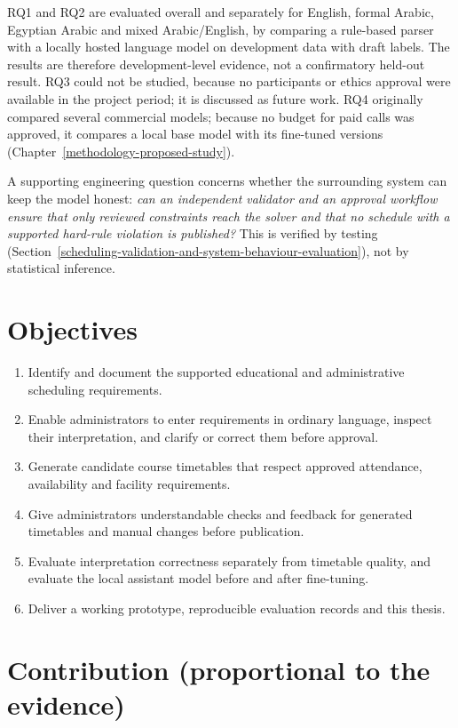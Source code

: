 RQ1 and RQ2 are evaluated overall and separately for English, formal Arabic, Egyptian Arabic and mixed Arabic/English, by comparing a rule-based parser with a locally hosted language model on development data with draft labels. The results are therefore development-level evidence, not a confirmatory held-out result. RQ3 could not be studied, because no participants or ethics approval were available in the project period; it is discussed as future work. RQ4 originally compared several commercial models; because no budget for paid calls was approved, it compares a local base model with its fine-tuned versions (Chapter~\ref{methodology-proposed-study}).

A supporting engineering question concerns whether the surrounding
system can keep the model honest: \emph{can an independent validator and
an approval workflow ensure that only reviewed constraints reach the
solver and that no schedule with a supported hard-rule violation is
published?} This is verified by testing
(Section~\ref{scheduling-validation-and-system-behaviour-evaluation}), not by statistical inference.

\hypertarget{objectives}{%
\section{Objectives}\label{objectives}}

\begin{enumerate}
\def\labelenumi{\arabic{enumi}.}
\tightlist
\item
  Identify and document the supported educational and administrative scheduling requirements.
\item
  Enable administrators to enter requirements in ordinary language, inspect their interpretation, and clarify or correct them before approval.
\item
  Generate candidate course timetables that respect approved attendance, availability and facility requirements.
\item
  Give administrators understandable checks and feedback for generated timetables and manual changes before publication.
\item
  Evaluate interpretation correctness separately from timetable quality, and evaluate the local assistant model before and after fine-tuning.
\item
  Deliver a working prototype, reproducible evaluation records and this thesis.
\end{enumerate}

\hypertarget{contribution-proportional-to-the-evidence}{%
\section{Contribution (proportional to the
evidence)}\label{contribution-proportional-to-the-evidence}}

